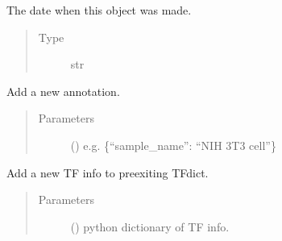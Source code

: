 \documentclass[letterpaper,10pt,english]{sphinxmanual}
\begin{document}
\begin{fulllineitems}
\begin{fulllineitems}
\begin{quote}
\begin{description}
\end{description}\end{quote}

\end{fulllineitems}


\begin{fulllineitems}
\label{\detokenize{modules/celloracle:celloracle.Net.object_initiation_date}}
The date when this object was made.
\begin{quote}\begin{description}
\item[{Type}] \leavevmode
str

\end{description}\end{quote}

\end{fulllineitems}


\begin{fulllineitems}
\label{\detokenize{modules/celloracle:celloracle.Net.addAnnotation}}
Add a new annotation.
\begin{quote}\begin{description}
\item[{Parameters}] \leavevmode
{} () \textendash{} e.g. \{“sample\_name”: “NIH 3T3 cell”\}

\end{description}\end{quote}

\end{fulllineitems}


\begin{fulllineitems}
\label{\detokenize{modules/celloracle:celloracle.Net.addTFinfo_dictionary}}
Add a new TF info to pre\sphinxhyphen{}exiting TFdict.
\begin{quote}\begin{description}
\item[{Parameters}] \leavevmode
{} () \textendash{} python dictionary of TF info.


\end{description}
\end{quote}
\end{fulllineitems}
\end{fulllineitems}
\end{document}
